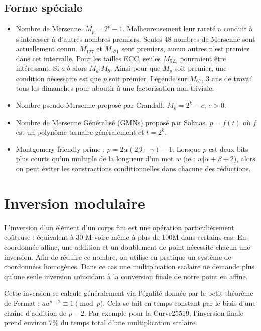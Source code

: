 \subsection{Forme spéciale}
\begin{itemize}
    \item Nombre de Mersenne. $M_p = 2^p - 1$. Malheureusement leur rareté a conduit à s'intéresser à d'autres nombres premiers. Seules $48$ nombres de Mersenne sont actuellement connu. $M_{127}$ et $M_{521}$ sont premiers, aucun autres n'est premier dans cet intervalle. Pour les tailles ECC, seules $M_{521}$ pourraient être intéressant. Si $a|b$ alors $M_a|M_b$. Ainsi pour que $M_p$ soit premier, une condition nécessaire est que $p$ soit premier. Légende sur $M_{67}$, 3 ans de travail tous les dimanches pour aboutir à une factorisation non triviale. 
    \item Nombre pseudo-Mersenne proposé par Crandall. $M_k = 2^k - c$, $c > 0$.
    \item Nombre de Mersenne Généralisé (GMNs) proposé par Solinas. $p = f(t)$ où $f$ est un polynôme ternaire généralement et $t = 2^k$.
    \item Montgomery-friendly prime : $p = 2\alpha(2\beta - \gamma) - 1$. Lorsque $p$ est deux bits plus courts qu'un multiple de la longueur d'un mot $w$ (ie : $w | \alpha + \beta +2$), alors on peut éviter les soustractions conditionnelles dans chacune des réductions.
\end{itemize}

\section{Inversion modulaire}
L'inversion d'un élément d'un corps fini est une opération particulièrement coûteuse : équivalent à 30 M voire même à plus de 100M dans certains cas. En coordonnée affine, une addition et un doublement de point nécessite chacun une inversion. Afin de réduire ce nombre, on utilise en pratique un système de coordonnées homogènes. Dans ce cas une multiplication scalaire ne demande plus qu'une seule inversion coïncidant à la conversion finale de notre point en affine. 

Cette inversion se calcule généralement via l'égalité donnée par le petit théorème de Fermat : $a a^{p-2} \equiv 1 \pmod p$. Cela se fait en temps constant par le biais d'une chaîne d'addition de $p-2$. Par exemple pour la Curve25519, l'inversion finale prend environ $7\%$ du temps total d'une multiplication scalaire.



